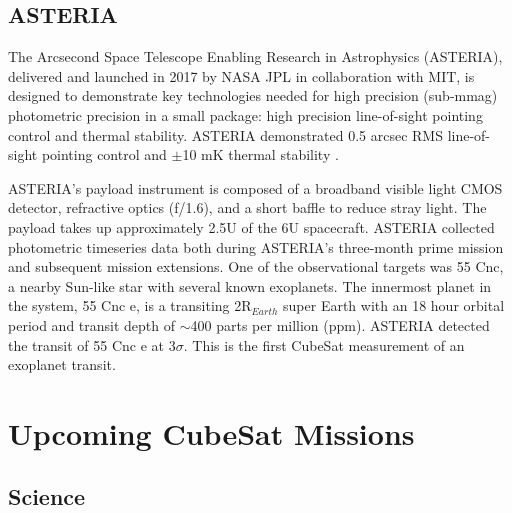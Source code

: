\documentclass[12pt]{article}
\begin{document}
\subsection{ASTERIA}
 The Arcsecond Space Telescope Enabling Research in Astrophysics (ASTERIA), delivered and launched in 2017 by NASA JPL in collaboration with MIT, is designed to demonstrate key technologies needed for high precision (sub-mmag) photometric precision in a small package: high precision line-of-sight pointing control and thermal stability.  ASTERIA demonstrated 0.5 arcsec RMS line-of-sight pointing control and $\pm$10 mK thermal stability \cite{smith_-orbit_2018}. 
 
 ASTERIA's payload instrument is composed of a broadband visible light CMOS detector, refractive optics (f/1.6), and a short baffle to reduce stray light.  The payload takes up approximately 2.5U of the 6U spacecraft.  ASTERIA collected photometric timeseries data both during ASTERIA's three-month prime mission and subsequent mission extensions. One of the observational targets was 55 Cnc, a nearby Sun-like star with several known exoplanets.  The innermost planet in the system, 55 Cnc e, is a transiting 2R$_{Earth}$ super Earth with an 18 hour orbital period and transit depth of $\sim$400 parts per million (ppm).  ASTERIA detected the transit of 55 Cnc e at 3$\sigma$.  This is the first CubeSat measurement of an exoplanet transit.

\section{Upcoming CubeSat Missions}
\subsection{Science}
\end{document}
